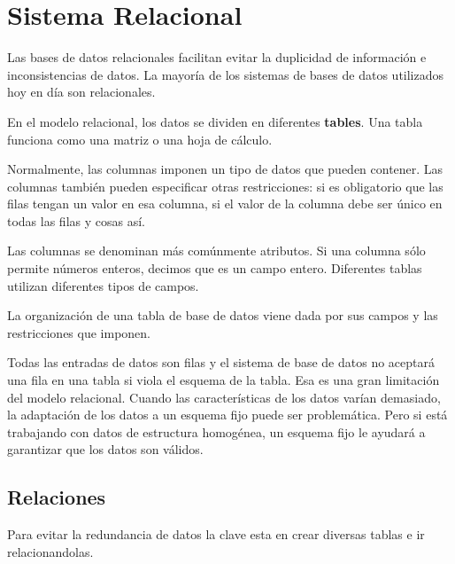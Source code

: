 \documentclass[12pt, fleqn]{report}                             %
\begin{document}
        \section{Sistema Relacional}

            Las bases de datos relacionales facilitan evitar la duplicidad de información
            e inconsistencias de datos.
            La mayoría de los sistemas de bases de datos utilizados hoy en día son relacionales.

            En el modelo relacional, los datos se dividen en diferentes \textbf{tables}.
            Una tabla funciona como una matriz o una hoja de cálculo.

            Normalmente, las columnas imponen un tipo de datos que pueden contener.
            Las columnas también pueden especificar otras restricciones: si es obligatorio que las
            filas tengan un valor en esa columna, si el valor de la columna debe ser único en todas
            las filas y cosas así.

            Las columnas se denominan más comúnmente atributos.
            Si una columna sólo permite números enteros, decimos que es un campo entero.
            Diferentes tablas utilizan diferentes tipos de campos.

            La organización de una tabla de base de datos viene dada por sus campos y las
            restricciones que imponen.

            Todas las entradas de datos son filas y el sistema de base de datos no aceptará
            una fila en una tabla si viola el esquema de la tabla. Esa es una gran limitación
            del modelo relacional.
            Cuando las características de los datos varían demasiado, la adaptación de los datos
            a un esquema fijo puede ser problemática. Pero si está trabajando con datos de
            estructura homogénea, un esquema fijo le ayudará a garantizar que los datos son válidos.



            \clearpage
            \subsection{Relaciones}

                Para evitar la redundancia de datos la clave esta en crear diversas tablas
                e ir relacionandolas.
\end{document}
